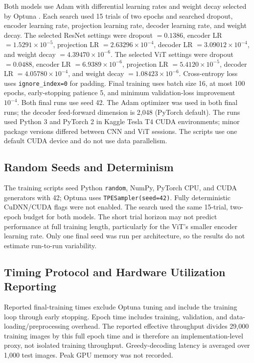 \documentclass[conference]{IEEEtran}
\begin{document}
Both models use Adam with differential learning rates and weight decay selected by Optuna \cite{optuna2019}. Each search used 15 trials of two epochs and searched dropout, encoder learning rate, projection learning rate, decoder learning rate, and weight decay. The selected ResNet settings were dropout $=0.1386$, encoder LR $=1.5291\times10^{-5}$, projection LR $=2.63296\times10^{-4}$, decoder LR $=3.09012\times10^{-4}$, and weight decay $=4.39470\times10^{-6}$. The selected ViT settings were dropout $=0.0488$, encoder LR $=6.9389\times10^{-6}$, projection LR $=5.4120\times10^{-5}$, decoder LR $=4.05780\times10^{-4}$, and weight decay $=1.08423\times10^{-6}$. Cross-entropy loss uses \texttt{ignore\_index=0} for padding. Final training uses batch size 16, at most 100 epochs, early-stopping patience 5, and minimum validation-loss improvement $10^{-4}$. Both final runs use seed 42. The Adam optimizer was used in both final runs; the decoder feed-forward dimension is 2{,}048 (PyTorch default). The runs used Python 3 and PyTorch 2 in Kaggle Tesla T4 CUDA environments; minor package versions differed between CNN and ViT sessions. The scripts use one default CUDA device and do not use data parallelism.

\subsection{Random Seeds and Determinism}

The training scripts seed Python \texttt{random}, NumPy, PyTorch CPU, and CUDA generators with 42; Optuna uses \texttt{TPESampler(seed=42)}. Fully deterministic CuDNN/CUDA flags were not enabled. The search used the same 15-trial, two-epoch budget for both models. The short trial horizon may not predict performance at full training length, particularly for the ViT's smaller encoder learning rate. Only one final seed was run per architecture, so the results do not estimate run-to-run variability.

\subsection{Timing Protocol and Hardware Utilization Reporting}

Reported final-training times exclude Optuna tuning and include the training loop through early stopping. Epoch time includes training, validation, and data-loading/preprocessing overhead. The reported effective throughput divides 29{,}000 training images by this full epoch time and is therefore an implementation-level proxy, not isolated training throughput. Greedy-decoding latency is averaged over 1{,}000 test images. Peak GPU memory was not recorded.
\end{document}
